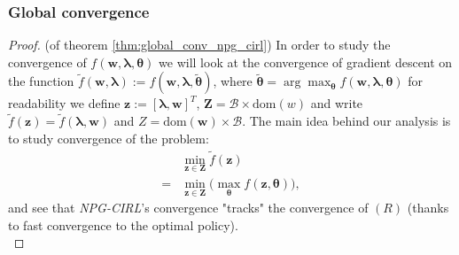 \subsubsection{Global convergence}
\label{sec:NPG_CIRL_global_convergence}
\begin{proof}
    (of theorem \ref{thm:global_conv_npg_cirl}) In order to study the convergence of $f(\bm{w},\bm{\lambda},\bm{\theta})$  we will look at the convergence of gradient descent on the function  $\tilde{f}(\bm{w},\bm{\lambda}) := f(\bm{w},\bm{\lambda},\tilde{\bm{\theta}})$, where $\tilde{\bm{\theta}} = \arg \max_{\bm{\theta}} f(\bm{w},\bm{\lambda},\bm{\theta})$ for readability we define $\bm{z} := [\bm{\lambda},\bm{w}]^T$, $\bm{Z}=\mathcal{B}\times \text{dom}(w)$ and write $\tilde{f}(\bm{z}) = \tilde{f}(\bm{\lambda},\bm{w})$ and $Z=\text{dom}(\bm{w})\times\mathcal{B}$. The main idea behind our analysis is to study convergence of the problem:
\begin{align*}
    &\min_{\bm{z}\in\bm{Z}} \tilde{f}(\bm{z}) \tag{R}\\
    =&\min_{\bm{z}\in\bm{Z}} \Big(  \max_{\bm{\theta}} {f}(\bm{z},\bm{\theta}) \Big),
\end{align*}
and see that \textit{NPG-CIRL}'s convergence "tracks" the convergence of $(R)$ (thanks to fast convergence to the optimal policy). \\


\end{proof}

